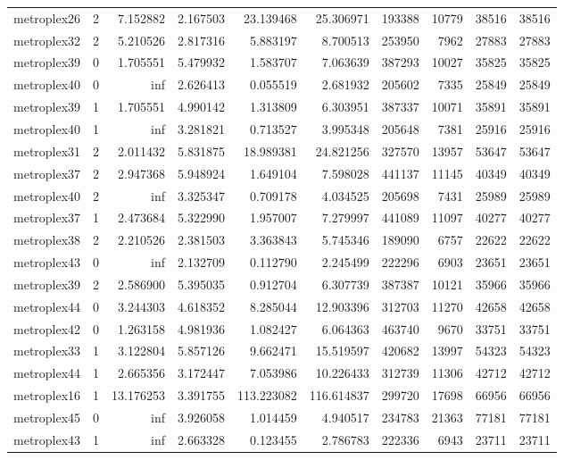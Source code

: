 \begin{longtable}{|l|r|r|r|r|r|r|r|r|r|}
metroplex26 & 2 & 7.152882 & 2.167503 & 23.139468 & 25.306971 & 193388 & 10779 & 38516 & 38516 \\
metroplex32 & 2 & 5.210526 & 2.817316 & 5.883197 & 8.700513 & 253950 & 7962 & 27883 & 27883 \\
metroplex39 & 0 & 1.705551 & 5.479932 & 1.583707 & 7.063639 & 387293 & 10027 & 35825 & 35825 \\
metroplex40 & 0 & inf & 2.626413 & 0.055519 & 2.681932 & 205602 & 7335 & 25849 & 25849 \\
metroplex39 & 1 & 1.705551 & 4.990142 & 1.313809 & 6.303951 & 387337 & 10071 & 35891 & 35891 \\
metroplex40 & 1 & inf & 3.281821 & 0.713527 & 3.995348 & 205648 & 7381 & 25916 & 25916 \\
metroplex31 & 2 & 2.011432 & 5.831875 & 18.989381 & 24.821256 & 327570 & 13957 & 53647 & 53647 \\
metroplex37 & 2 & 2.947368 & 5.948924 & 1.649104 & 7.598028 & 441137 & 11145 & 40349 & 40349 \\
metroplex40 & 2 & inf & 3.325347 & 0.709178 & 4.034525 & 205698 & 7431 & 25989 & 25989 \\
metroplex37 & 1 & 2.473684 & 5.322990 & 1.957007 & 7.279997 & 441089 & 11097 & 40277 & 40277 \\
metroplex38 & 2 & 2.210526 & 2.381503 & 3.363843 & 5.745346 & 189090 & 6757 & 22622 & 22622 \\
metroplex43 & 0 & inf & 2.132709 & 0.112790 & 2.245499 & 222296 & 6903 & 23651 & 23651 \\
metroplex39 & 2 & 2.586900 & 5.395035 & 0.912704 & 6.307739 & 387387 & 10121 & 35966 & 35966 \\
metroplex44 & 0 & 3.244303 & 4.618352 & 8.285044 & 12.903396 & 312703 & 11270 & 42658 & 42658 \\
metroplex42 & 0 & 1.263158 & 4.981936 & 1.082427 & 6.064363 & 463740 & 9670 & 33751 & 33751 \\
metroplex33 & 1 & 3.122804 & 5.857126 & 9.662471 & 15.519597 & 420682 & 13997 & 54323 & 54323 \\
metroplex44 & 1 & 2.665356 & 3.172447 & 7.053986 & 10.226433 & 312739 & 11306 & 42712 & 42712 \\
metroplex16 & 1 & 13.176253 & 3.391755 & 113.223082 & 116.614837 & 299720 & 17698 & 66956 & 66956 \\
metroplex45 & 0 & inf & 3.926058 & 1.014459 & 4.940517 & 234783 & 21363 & 77181 & 77181 \\
metroplex43 & 1 & inf & 2.663328 & 0.123455 & 2.786783 & 222336 & 6943 & 23711 & 23711 \\

\end{longtable}

